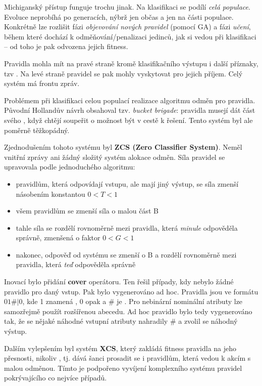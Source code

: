 Michiganský přístup funguje trochu jinak. Na klasifikaci se podílí \textit{celá populace}. Evoluce neprobíhá po generacích, nýbrž jen občas a jen na části populace. Konkrétně lze rozlišit fázi \textit{objevování nových pravidel} (pomocí GA) a fázi \textit{učení}, během které dochází k odměňování/penalizaci jedinců, jak si vedou při klasifikaci -- od toho je pak odvozena jejich fitness.

Pravidla mohla mít na pravé straně kromě klasifikačního výstupu i další příznaky, tzv . Na levé straně pravidel se pak mohly vyskytovat  pro jejich příjem. Celý systém má frontu zpráv.

Problémem při klasifikaci celou populací realizace algoritmu odměn pro pravidla. Původní Hollandův návrh obsahoval tzv. \textit{bucket brigade}: pravidla musejí dát část svého , když chtějí soupeřit o možnost být v cestě k řešení. Tento systém byl ale poměrně těžkopádný. 

Zjednodušením tohoto systému byl \textbf{ZCS (Zero Classifier System)}. Neměl vnitřní zprávy ani žádný složitý systém alokace odměn. Síla pravidel se upravovala podle jednoduchého algoritmu:
\begin{itemize}
	
	
	\item pravidlům, která odpovídají vstupu, ale mají jiný výstup, se síla zmenší násobením konstantou $0 < T < 1$
	\item všem pravidlům se zmenší síla o malou část B
	\item tahle síla se rozdělí rovnoměrně mezi pravidla, která \textit{minule} odpověděla správně, zmenšená o faktor $0<G<1$
	\item nakonec, odpověď od systému se zmenší o B a rozdělí rovnoměrně mezi pravidla, která \textit{teď} odpověděla správně
\end{itemize}
Inovací bylo přidání \textbf{cover} operátoru. Ten řešil případy, kdy nebylo žádné pravidlo pro daný vstup. Pak bylo vygenerováno ad hoc. Pravidla jsou ve formátu $01\#|0$, kde 1 znamená , 0 opak a $\#$ je . Pro nebinární nominální atributy lze samozřejmě použít rozšířenou abecedu. Ad hoc pravidlo bylo tedy vygenerováno tak, že se nějaké náhodné vstupní atributy nahradily $\#$ a zvolil se náhodný výstup.

Dalším vylepšením byl systém \textbf{XCS}, který zakládá fitness pravidla na jeho přesnosti, nikoliv , tj. dává šanci prosadit se i pravidlům, která vedou k akcím s malou odměnou. Tímto je podpořeno vyvíjení komplexního systému pravidel pokrývajícího co nejvíce případů.




